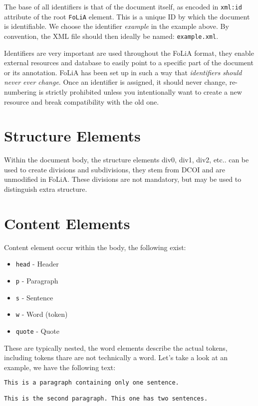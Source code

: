 \documentclass[a4paper,12pt]{report}
\begin{document}
The base of all identifiers is that of the document itself, as encoded in \texttt{xml:id} attribute of the root \texttt{FoLiA} element. This is a unique ID by which the document is identifiable. We choose the identifier \emph{example} in the example above. By convention, the XML file should then ideally be named: \texttt{example.xml}.

Identifiers are very important are used throughout the FoLiA format, they enable external resources and database to easily point to a specific part of the document or its annotation. FoLiA has been set up in such a way that \emph{identifiers should never ever change}. Once an identifier is assigned, it should never change, re-numbering is strictly prohibited unless you intentionally want to create a new resource and break compatibility with the old one.

\section{Structure Elements}

Within the document body, the structure elements div0, div1, div2, etc.. can be used to create divisions and subdivisions, they stem from DCOI and are unmodified in FoLiA. These divisions are not mandatory, but may be used to distinguish extra structure.

\section{Content Elements}

Content element occur within the body, the following exist:

\begin{itemize}
\item \texttt{head} - Header
\item \texttt{p} - Paragraph
\item \texttt{s} - Sentence
\item \texttt{w} - Word (token)
\item \texttt{quote} - Quote
\end{itemize}

These are typically nested, the word elements describe the actual tokens, including tokens thare are not technically a word. Let's take a look at an example, we have the following text:


\begin{lstlisting}[language=xml]
This is a paragraph containing only one sentence.

This is the second paragraph. This one has two sentences.
\end{lstlisting}
\end{document}
